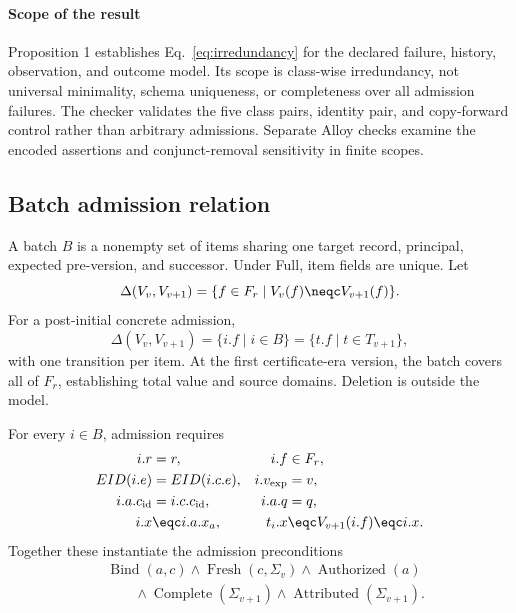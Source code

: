 \paragraph{Scope of the result}
Proposition 1 establishes Eq.~\eqref{eq:irredundancy} for the declared failure, history, observation, and outcome model. Its scope is class-wise irredundancy, not universal minimality, schema uniqueness, or completeness over all admission failures. The checker validates the five class pairs, identity pair, and copy-forward control rather than arbitrary admissions. Separate Alloy checks examine the encoded assertions and conjunct-removal sensitivity in finite scopes.

\subsection{Batch admission relation}

A batch $B$ is a nonempty set of items sharing one target record, principal, expected pre-version, and successor. Under Full, item fields are unique. Let
\begin{equation}
\Delta(V_v,V_{v+1})=\{f\in F_r\mid V_v(f)\neqc V_{v+1}(f)\}.
\end{equation}
For a post-initial concrete admission,
\begin{equation}
\Delta(V_v,V_{v+1})=\{i.f\mid i\in B\}=\{t.f\mid t\in T_{v+1}\},
\label{eq:changed-fields}
\end{equation}
with one transition per item. At the first certificate-era version, the batch covers all of $F_r$, establishing total value and source domains. Deletion is outside the model.

For every $i\in B$, admission requires
\begin{align}
i.r &= r, & i.f&\in F_r,\nonumber\\
EID(i.e) &= EID(i.c.e), & i.v_{\mathrm{exp}}&=v,\nonumber\\
i.a.c_{\mathrm{id}}&=i.c.c_{\mathrm{id}}, & i.a.q&=q,\nonumber\\
i.x &\eqc i.a.x_a, & t_i.x&\eqc V_{v+1}(i.f)\eqc i.x.
\label{eq:item-bindings}
\end{align}
Together these instantiate the admission preconditions
\begin{equation}
\begin{aligned}
&\operatorname{Bind}(a,c)\land\operatorname{Fresh}(c,\Sigma_v)\land\operatorname{Authorized}(a)\\
&\qquad\land\operatorname{Complete}(\Sigma_{v+1})\land\operatorname{Attributed}(\Sigma_{v+1}).
\end{aligned}
\end{equation}


